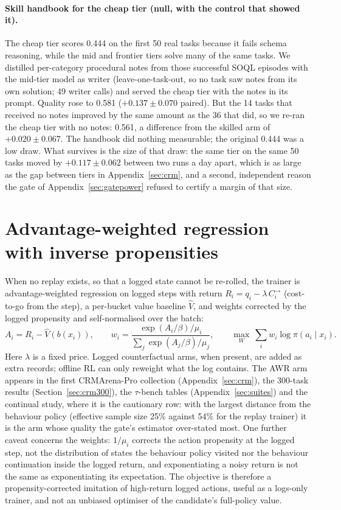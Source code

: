 \documentclass[10pt]{article}
\begin{document}
\paragraph{Skill handbook for the cheap tier (null, with the control that showed it).} The cheap tier scores 0.444 on the first 50 real tasks because it fails schema reasoning, while the mid and frontier tiers solve many of the same tasks. We distilled per-category procedural notes from those successful SOQL episodes with the mid-tier model as writer (leave-one-task-out, so no task saw notes from its own solution; 49 writer calls) and served the cheap tier with the notes in its prompt. Quality rose to 0.581 ($+0.137\pm0.070$ paired). But the 14 tasks that received no notes improved by the same amount as the 36 that did, so we re-ran the cheap tier with no notes: 0.561, a difference from the skilled arm of $+0.020\pm0.067$. The handbook did nothing measurable; the original 0.444 was a low draw. What survives is the size of that draw: the same tier on the same 50 tasks moved by $+0.117\pm0.062$ between two runs a day apart, which is as large as the gap between tiers in Appendix~\ref{sec:crm}, and a second, independent reason the gate of Appendix~\ref{sec:gatepower} refused to certify a margin of that size.

\section{Advantage-weighted regression with inverse propensities}
\label{app:awr}

When no replay exists, so that a logged state cannot be re-rolled, the trainer is advantage-weighted regression \citep{peng2019awr} on logged steps with return $R_i=q_i-\lambda\,C^{\to}_i$ (cost-to-go from the step), a per-bucket value baseline $\hat V$, and weights corrected by the logged propensity and self-normalised over the batch:
\begin{equation}
A_i=R_i-\hat V(b(x_i)),\qquad
w_i=\frac{\exp(A_i/\beta)/\mu_i}{\sum_j\exp(A_j/\beta)/\mu_j},\qquad
\max_W\ \sum_i w_i\log\pi(a_i\mid x_i).
\label{eq:awr}
\end{equation}
Here $\lambda$ is a fixed price. Logged counterfactual arms, when present, are added as extra records; offline RL can only reweight what the log contains. The AWR arm appears in the first CRMArena-Pro collection (Appendix~\ref{sec:crm}), the 300-task results (Section~\ref{sec:crm300}), the $\tau$-bench tables (Appendix~\ref{sec:suites}) and the continual study, where it is the cautionary row: with the largest distance from the behaviour policy (effective sample size 25\% against 54\% for the replay trainer) it is the arm whose quality the gate's estimator over-stated most. One further caveat concerns the weights: $1/\mu_i$ corrects the action propensity at the logged step, not the distribution of states the behaviour policy visited nor the behaviour continuation inside the logged return, and exponentiating a noisy return is not the same as exponentiating its expectation. The objective is therefore a propensity-corrected imitation of high-return logged actions, useful as a logs-only trainer, and not an unbiased optimiser of the candidate's full-policy value.
\end{document}
